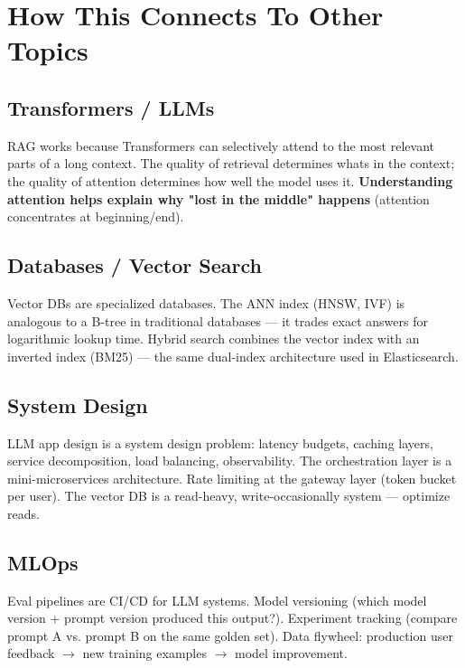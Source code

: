 \documentclass[11pt]{article}
\begin{document}
\section{How This Connects To Other Topics}\label{how-this-connects-to-other-topics}

\subsection{Transformers / LLMs}\label{transformers--llms}

RAG works because Transformers can selectively attend to the most relevant parts of a long context. The quality of retrieval determines what\textquotesingle s in the context; the quality of attention determines how well the model uses it. \textbf{Understanding attention helps explain why "lost in the middle" happens} (attention concentrates at beginning/end).

\subsection{Databases / Vector Search}\label{databases--vector-search}

Vector DBs are specialized databases. The ANN index (HNSW, IVF) is analogous to a B-tree in traditional databases --- it trades exact answers for logarithmic lookup time. Hybrid search combines the vector index with an inverted index (BM25) --- the same dual-index architecture used in Elasticsearch.

\subsection{System Design}\label{system-design}

LLM app design is a system design problem: latency budgets, caching layers, service decomposition, load balancing, observability. The orchestration layer is a mini-microservices architecture. Rate limiting at the gateway layer (token bucket per user). The vector DB is a read-heavy, write-occasionally system --- optimize reads.

\subsection{MLOps}\label{mlops}

Eval pipelines are CI/CD for LLM systems. Model versioning (which model version + prompt version produced this output?). Experiment tracking (compare prompt A vs. prompt B on the same golden set). Data flywheel: production user feedback \(\rightarrow\) new training examples \(\rightarrow\) model improvement.
\end{document}
